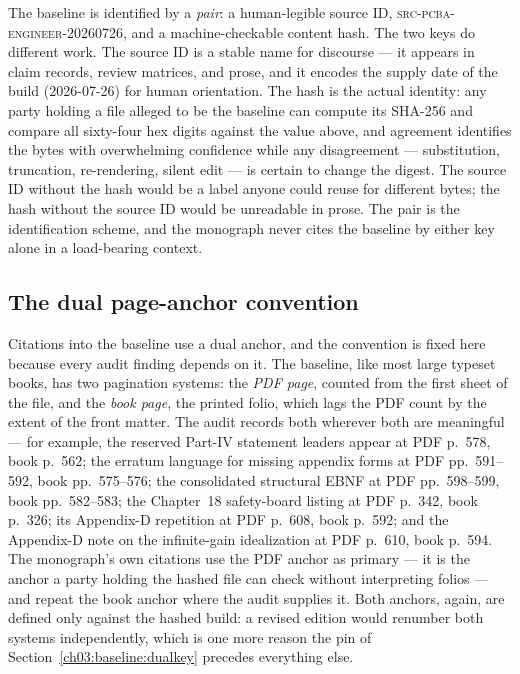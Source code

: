 The baseline is identified by a \emph{pair}: a human-legible source ID,
\textsc{src-pcba-engineer-20260726}, and a machine-checkable content
hash. The two keys do different work. The source ID is a stable name for
discourse --- it appears in claim records, review matrices, and prose,
and it encodes the supply date of the build (2026-07-26) for human
orientation. The hash is the actual identity: any party holding a file
alleged to be the baseline can compute its SHA-256 and compare all
sixty-four hex digits against the value above, and agreement identifies
the bytes with overwhelming confidence while any disagreement ---
substitution, truncation, re-rendering, silent edit --- is certain to
change the digest. The source ID without the hash would be a label
anyone could reuse for different bytes; the hash without the source ID
would be unreadable in prose. The pair is the identification scheme, and
the monograph never cites the baseline by either key alone in a
load-bearing context.

\subsection{The dual page-anchor convention}\label{ch03:baseline:anchors}

Citations into the baseline use a dual anchor, and the convention is
fixed here because every audit finding depends on it. The baseline, like
most large typeset books, has two pagination systems: the \emph{PDF
page}, counted from the first sheet of the file, and the \emph{book
page}, the printed folio, which lags the PDF count by the extent of the
front matter. The audit records both wherever both are meaningful ---
for example, the reserved Part-IV statement leaders appear at PDF
p.~578, book p.~562; the erratum language for missing appendix forms at
PDF pp.~591--592, book pp.~575--576; the consolidated structural EBNF at
PDF pp.~598--599, book pp.~582--583; the Chapter~18 safety-board listing
at PDF p.~342, book p.~326; its Appendix-D repetition at PDF p.~608,
book p.~592; and the Appendix-D note on the infinite-gain idealization
at PDF p.~610, book p.~594. The monograph's own citations use the PDF
anchor as primary --- it is the anchor a party holding the hashed file
can check without interpreting folios --- and repeat the book anchor
where the audit supplies it. Both anchors, again, are defined only
against the hashed build: a revised edition would renumber both systems
independently, which is one more reason the pin of
Section~\ref{ch03:baseline:dualkey} precedes everything else.

